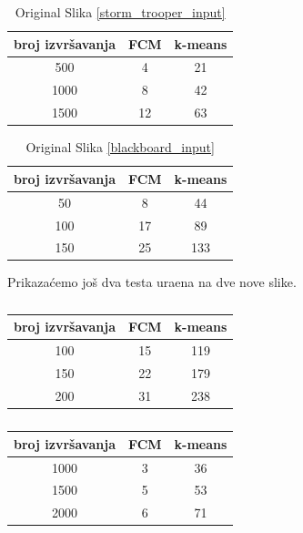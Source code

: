 \documentclass[12pt,a4paper]{article}
\theoremstyle{definition}
\theoremstyle{remark}
\theoremstyle{plain}
\begin{document}
\begin{multicols}{2}
\begin{table}[H]
\centering
  \begin{tabular}{c|c|c}
  broj izvr\v savanja & FCM & k-means\\
  \hline
  500 & 4 & 21\\
  1000 & 8 & 42\\
  1500 & 12 & 63 
\end{tabular}
  \caption{Original Slika \ref{storm_trooper_input}}
  \label{vreme_storm}
\end{table}

\columnbreak

\begin{table}[H]
\centering
\begin{tabular}{c|c|c}
  broj izvr\v savanja & FCM & k-means\\
  \hline
  50 & 8 & 44\\
  100 & 17 & 89\\
  150 & 25 & 133 
\end{tabular}
  \caption{Original Slika \ref{blackboard_input}}
  \label{vreme_blackboard}
\end{table}
\end{multicols}

Prikaza\' cemo jo\v s dva testa ura\dj ena na dve nove slike.

\begin{multicols}{2}
\begin{table}[H]
\centering
  \begin{tabular}{c|c|c}
  broj izvr\v savanja & FCM & k-means\\
  \hline
    100 & 15&  119 \\
    150&  22&  179 \\
    200&  31&  238
\end{tabular}
  \caption{}
\end{table}

\columnbreak

\begin{table}[H]
\centering
\begin{tabular}{c|c|c}
  broj izvr\v savanja & FCM & k-means\\
  \hline
  1000 & 3 & 36\\
  1500 & 5 & 53\\
  2000 & 6 & 71
\end{tabular}
  \caption{}
\end{table}
\end{multicols}
\end{document}
